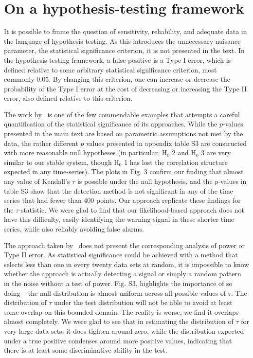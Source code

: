 \documentclass[authoryear, preprint,review,12pt]{elsarticle}
\begin{document}
\section{On a hypothesis-testing framework}
It is possible to frame the question of sensitivity, reliability, and adequate data in the language of hypothesis testing. As this introduces the unnecessary nuisance parameter, the statistical significance criterion, it is not presented in the text.  In the hypothesis testing framework, a false positive is a Type I error, which is defined relative to some arbitrary statistical significance criterion, most commonly 0.05.  By changing this criterion, one can increase or decrease the probability of the Type I error at the cost of decreasing or increasing the Type II error, also defined relative to this criterion.  

The work by~\citet{Dakos2008} is one of the few commendable examples that attempts a careful quantification of the statistical significance of its approaches.  While the $p$-values presented in the main text are based on parametric assumptions not met by the data, the rather different $p$ values presented in appendix table S3 are constructed with more reasonable null hypotheses (in particular, H$_0$ 2 and H$_0$ 3 are very similar to our stable system, though H$_0$ 1 has lost the correlation structure expected in any time-series).  The plots in Fig. 3 confirm our finding that almost any value of Kendall's $\tau$ is possible under the null hypothesis, and the $p$-values in table S3 show that the detection method is not significant in any of the time series that had fewer than 400 points.  Our approach replicate these findings for the $\tau$-statistic.  We were glad to find that our likelihood-based approach does not have this difficulty, easily identifying the warning signal in these shorter time series, while also reliably avoiding false alarms.  

The approach taken by~\citet{Dakos2008} does not present the corresponding analysis of power or Type II error.  As statistical significance could be achieved with a method that selects less than one in every twenty data sets at random, it is impossible to know whether the approach is actually detecting a signal or simply a random pattern in the noise without a test of power.  Fig. S3, highlights the importance of so doing -- the null distribution is almost uniform across all possible values of $\tau$.  The distribution of $\tau$ under the test distribution will not be able to avoid at least some overlap on this bounded domain.  The reality is worse, we find it overlaps almost completely.  We were glad to see that in estimating the distribution of $\tau$ for very large data sets, it does tighten around zero, while the distribution expected under a true positive condenses around more positive values, indicating that there is at least some discriminative ability in the test. 
\end{document}
